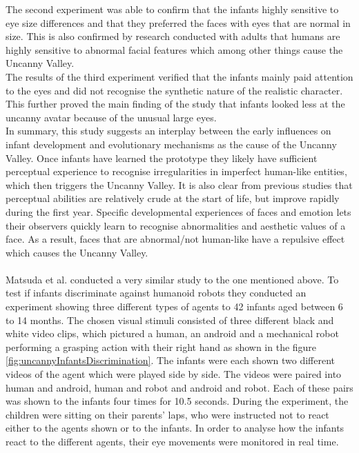The second experiment was able to confirm that the infants highly sensitive to eye size differences and that they preferred the faces with eyes that are normal in size. This is also confirmed by research conducted with adults that humans are highly sensitive to abnormal facial features which among other things cause the Uncanny Valley. \cite{uncanny_infants}\\
The results of the third experiment verified that the infants mainly paid attention to the eyes and did not recognise the synthetic nature of the realistic character. This further proved the main finding of the study that infants looked less at the uncanny avatar because of the unusual large eyes. \cite{uncanny_infants}\\
In summary, this study suggests an interplay between the early influences on infant development and evolutionary mechanisms as the cause of the Uncanny Valley. Once infants have learned the prototype they likely have sufficient perceptual experience to recognise irregularities in imperfect human-like entities, which then triggers the Uncanny Valley. It is also clear from previous studies that perceptual abilities are relatively crude at the start of life, but improve rapidly during the first year. Specific developmental experiences of faces and emotion lets their observers quickly learn to recognise abnormalities and aesthetic values of a face. As a result, faces that are abnormal/not human-like have a repulsive effect which causes the Uncanny Valley. \cite{uncanny_infants}\\\\
Matsuda et al. \cite{uncanny_infant_discrimination} conducted a very similar study to the one mentioned above. 
To test if infants discriminate against humanoid robots they conducted an experiment showing three different types of agents to 42 infants aged between 6 to 14 months. The chosen visual stimuli consisted of three different black and white video clips, which pictured a human, an android and a mechanical robot performing a grasping action with their right hand as shown in the figure \ref{fig:uncannyInfantsDiscrimination}. The infants were each shown two different videos of the agent which were played side by side. 
\newpage
The videos were paired into human and android, human and robot and android and robot. Each of these pairs was shown to the infants four times for 10.5 seconds. During the experiment, the children were sitting on their parents' laps, who were instructed not to react either to the agents shown or to the infants. In order to analyse how the infants react to the different agents, their eye movements were monitored in real time. \cite{uncanny_infant_discrimination}
